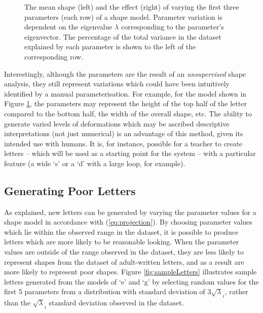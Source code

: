 \documentclass{sig-alternate}
\begin{document}
\begin{figure}[thpb]
\centering
{}
\caption[The mean shape and the effect of varying the first three parameters of
the shape model derived from PCA from the dataset of print `s'
shapes.]{\label{fig:deviations_sPrint}The mean shape (left) and the effect
    (right) of varying the first three parameters (each row) of a shape model.
     Parameter variation is dependent on the eigenvalue $\lambda$ corresponding to
the parameter's eigenvector. The percentage of the total variance in the dataset
explained by each parameter is shown to the left of the corresponding row. }

\end{figure}



Interestingly, although the parameters are the result of an \emph{unsupervised}
shape analysis, they still represent variations which could have been
intuitively identified by a manual parameterisation. For example, for the model
shown in Figure \ref{fig:deviations_sPrint}, the parameters may represent the
height of the top half of the letter compared to the bottom half, the width of
the overall shape, etc. The ability to generate varied levels of deformations
which may be ascribed descriptive interpretations (not just numerical) is an
advantage of this method, given its intended use with humans. It is, for
instance, possible for a teacher to create letters -- which will be used as a
starting point for the system -- with a particular feature (a wide `s' or a `d'
with a large loop, for example).


\subsection{Generating Poor Letters}

As explained, new letters can be generated by varying the parameter values for a
shape model in accordance with (\ref{eq:projection}). By choosing parameter
values which lie within the observed range in the dataset, it is possible to
produce letters which are more likely to be reasonable looking.  When the
parameter values are outside of the range observed in the dataset, they are less
likely to represent shapes from the dataset of adult-written letters, and as a
result are more likely to represent poor shapes.  Figure \ref{fig:sampleLetters}
illustrates sample letters generated from the models of `e' and `g' by selecting
random values for the first 5 parameters from a distribution with standard
deviation of $3\sqrt\lambda_i$, rather than the $\sqrt\lambda_i$ standard
deviation observed in the dataset.
\end{document}
